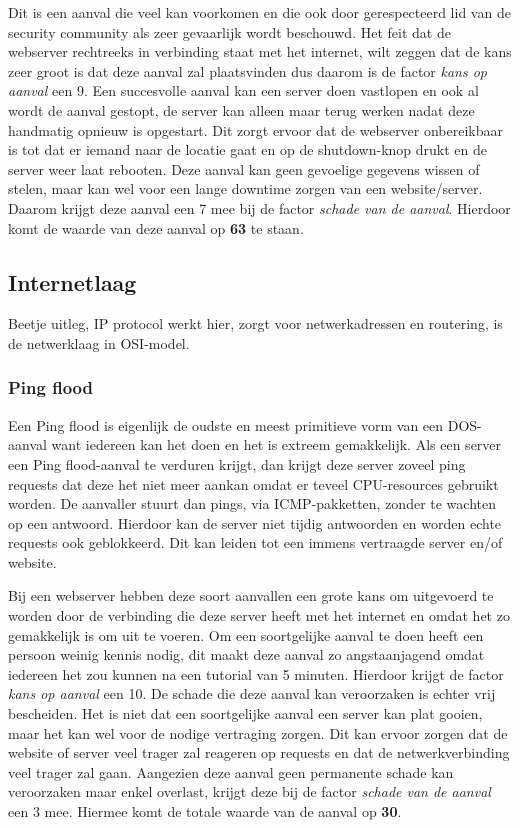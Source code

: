 \documentclass[pdftex,a4paper,12pt]{report}
\begin{document}
Dit is een aanval die veel kan voorkomen en die ook door gerespecteerd lid van de security community \cite{Bown2013} als zeer gevaarlijk wordt beschouwd. Het feit dat de webserver rechtreeks in verbinding staat met het internet, wilt zeggen dat de kans zeer groot is dat deze aanval zal plaatsvinden dus daarom is de factor \textit{kans op aanval} een 9. Een succesvolle aanval kan een server doen vastlopen en ook al wordt de aanval gestopt, de server kan alleen maar terug werken nadat deze handmatig opnieuw is opgestart. Dit zorgt ervoor dat de webserver onbereikbaar is tot dat er iemand naar de locatie gaat en op de shutdown-knop drukt en de server weer laat rebooten. Deze aanval kan geen gevoelige gegevens wissen of stelen, maar kan wel voor een lange downtime zorgen van een website/server. Daarom krijgt deze aanval een 7 mee bij de factor \textit{schade van de aanval}. Hierdoor komt de waarde van deze aanval op \textbf{63} te staan.

\subsection{Internetlaag}
Beetje uitleg, IP protocol werkt hier, zorgt voor netwerkadressen en routering, is de netwerklaag in OSI-model.

\subsubsection{Ping flood}
Een Ping flood is eigenlijk de oudste en meest primitieve vorm van een DOS-aanval want iedereen kan het doen en het is extreem gemakkelijk. Als een server een Ping flood-aanval te verduren krijgt, dan krijgt deze server zoveel ping requests dat deze het niet meer aankan omdat er teveel CPU-resources gebruikt worden. De aanvaller stuurt dan pings, via ICMP-pakketten, zonder te wachten op een antwoord. Hierdoor kan de server niet tijdig antwoorden en worden echte requests ook geblokkeerd. Dit kan leiden tot een immens vertraagde server en/of website. \citep{Grid2010}

Bij een webserver hebben deze soort aanvallen een grote kans om uitgevoerd te worden door de verbinding die deze server heeft met het internet en omdat het zo gemakkelijk is om uit te voeren. Om een soortgelijke aanval te doen heeft een persoon weinig kennis nodig, dit maakt deze aanval zo angstaanjagend omdat iedereen het zou kunnen na een tutorial van 5 minuten. Hierdoor krijgt de factor \textit{kans op aanval} een 10. De schade die deze aanval kan veroorzaken is echter vrij bescheiden. Het is niet dat een soortgelijke aanval een server kan plat gooien, maar het kan wel voor de nodige vertraging zorgen. Dit kan ervoor zorgen dat de website of server veel trager zal reageren op requests en dat de netwerkverbinding veel trager zal gaan. Aangezien deze aanval geen permanente schade kan veroorzaken maar enkel overlast, krijgt deze bij de factor \textit{schade van de aanval} een 3 mee. Hiermee komt de totale waarde van de aanval op \textbf{30}.
\end{document}
